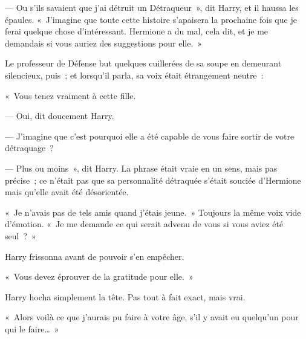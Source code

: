 --- Ou s'ils savaient que j'ai détruit un Détraqueur~», dit Harry, et il haussa les épaules. «~J'imagine que toute cette histoire s'apaisera la prochaine fois que je ferai quelque chose d'intéressant. Hermione a du mal, cela dit, et je me demandais si vous auriez des suggestions pour elle.~»

Le professeur de Défense but quelques cuillerées de sa soupe en demeurant silencieux, puis~; et lorsqu'il parla, sa voix était étrangement neutre~:

«~Vous tenez vraiment à cette fille.

--- Oui, dit doucement Harry.

--- J'imagine que c'est pourquoi elle a été capable de vous faire sortir de votre détraquage~?

--- Plus ou moins~», dit Harry. La phrase était vraie en un sens, mais pas précise~; ce n'était pas que sa personnalité détraquée s'était souciée d'Hermione mais qu'elle avait été désorientée.

«~Je n'avais pas de tels amis quand j'étais jeune.~» Toujours la même voix vide d'émotion. «~Je me demande ce qui serait advenu de vous si vous aviez été seul~?~»

Harry frissonna avant de pouvoir s'en empêcher.

«~Vous devez éprouver de la gratitude pour elle.~»

Harry hocha simplement la tête. Pas tout à fait exact, mais vrai.

«~Alors voilà ce que j'aurais pu faire à votre âge, s'il y avait eu quelqu'un pour qui le faire…~»
